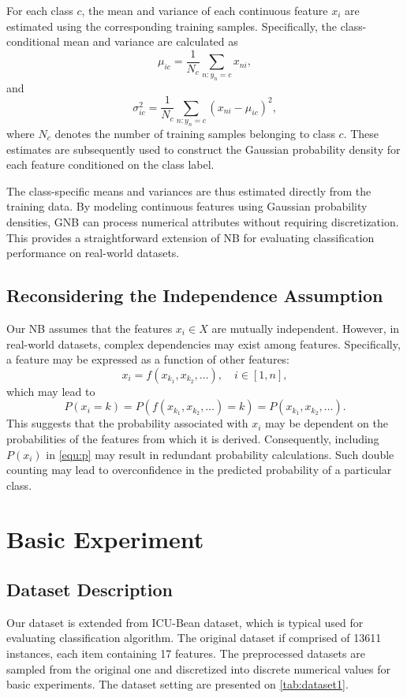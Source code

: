 \documentclass[10pt,a4paper]{article}
\begin{document}
	For each class $c$, the mean and variance of each continuous feature $x_i$ are estimated using the corresponding training samples. Specifically, the class-conditional mean and variance are calculated as
	\[
	\mu_{ic}=\frac{1}{N_c}\sum_{n:y_n=c}x_{ni},
	\]
	and
	\[
	\sigma_{ic}^{2}=\frac{1}{N_c}\sum_{n:y_n=c}(x_{ni}-\mu_{ic})^2,
	\]
	where $N_c$ denotes the number of training samples belonging to class $c$. These estimates are subsequently used to construct the Gaussian probability density for each feature conditioned on the class label.
	
	The class-specific means and variances are thus estimated directly from the training data. By modeling continuous features using Gaussian probability densities, GNB can process numerical attributes without requiring discretization. This provides a straightforward extension of NB for evaluating classification performance on real-world datasets.
	
	
	\subsection{Reconsidering the Independence Assumption}
	
	Our NB assumes that the features $x_i \in X$ are mutually independent. However, in real-world datasets, complex dependencies may exist among features. Specifically, a feature may be expressed as a function of other features:
	\[
	x_i = f(x_{k_1}, x_{k_2}, \ldots), \quad i \in [1,n],
	\]
	which may lead to
	\[
	P(x_i = k)
	= P(f(x_{k_1}, x_{k_2}, \ldots)=k)
	= P(x_{k_1}, x_{k_2}, \ldots).
	\]
	This suggests that the probability associated with $x_i$ may be dependent on the probabilities of the features from which it is derived. Consequently, including $P(x_i)$ in \autoref{equ:p} may result in redundant probability calculations. Such double counting may lead to overconfidence in the predicted probability of a particular class.
	
	
	\section{Basic Experiment}
	\subsection{Dataset Description}
	Our dataset is extended from ICU-Bean dataset, which is typical used for evaluating classification algorithm. The original dataset if comprised of 13611 instances, each item containing 17 features. The preprocessed datasets are sampled from the original one and discretized into discrete numerical values for basic experiments. The dataset setting are presented on \autoref{tab:dataset1}. 
	
\end{document}
